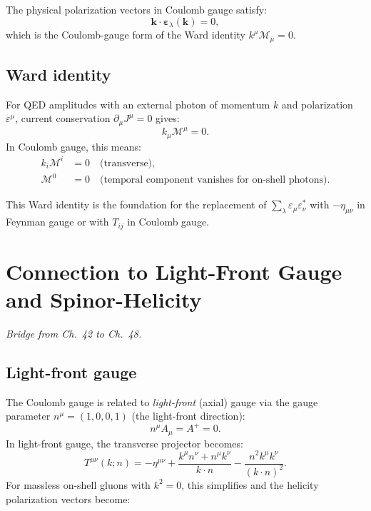The physical polarization vectors in Coulomb gauge satisfy:
\begin{equation}\label{eq:transverse-pol}
  \mathbf{k}\cdot\boldsymbol\varepsilon_\lambda(\mathbf{k}) = 0,
\end{equation}
which is the Coulomb-gauge form of the Ward identity $k^\mu\mathcal{M}_\mu = 0$.

\subsection{Ward identity}

For QED amplitudes with an external photon of momentum $k$ and polarization
$\varepsilon^\mu$, current conservation $\partial_\mu J^\mu = 0$ gives:
\begin{equation}\label{eq:ward}
  k_\mu \mathcal{M}^\mu = 0.
\end{equation}
In Coulomb gauge, this means:
\begin{align}
  k_i \mathcal{M}^i &= 0 \quad\text{(transverse)}, \\
  \mathcal{M}^0 &= 0 \quad\text{(temporal component vanishes for on-shell photons)}.
\end{align}

This Ward identity is the foundation for the replacement of $\sum_\lambda \varepsilon_\mu\varepsilon_\nu^*$
with $-\eta_{\mu\nu}$ in Feynman gauge or with $T_{ij}$ in Coulomb gauge.

\section{Connection to Light-Front Gauge and Spinor-Helicity}

\textit{Bridge from Ch.~42 to Ch.~48.}

\subsection{Light-front gauge}

The Coulomb gauge is related to \emph{light-front} (axial) gauge via the gauge
parameter $n^\mu = (1,0,0,1)$ (the light-front direction):
\begin{equation}
  n^\mu A_\mu = A^+ = 0.
\end{equation}
In light-front gauge, the transverse projector becomes:
\begin{equation}
  T^{\mu\nu}(k;n) = -\eta^{\mu\nu}
  + \frac{k^\mu n^\nu + n^\mu k^\nu}{k\cdot n}
  - \frac{n^2 k^\mu k^\nu}{(k\cdot n)^2}.
\end{equation}
For massless on-shell gluons with $k^2=0$, this simplifies and the helicity
polarization vectors become:

